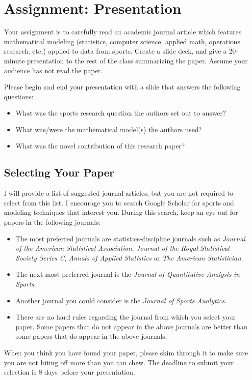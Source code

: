 \documentclass{article}
\begin{document}
  \section*{\sc Assignment: Presentation}

    Your assignment is to carefully read an academic journal article which features mathematical modeling (statistics, computer science, applied math, operations research, etc.) applied to data from sports. Create a slide deck, and give a 20-minute presentation to the rest of the class summarizing the paper. Assume your audience has not read the paper.
    
    Please begin and end your presentation with a slide that answers the following questions:
    \begin{itemize}
      \item What was the sports research question the authors set out to answer?
      \item What was/were the mathematical model(s) the authors used?
      \item What was the novel contribution of this research paper?
    \end{itemize}

    \subsection*{\sc Selecting Your Paper}
      
      I will provide a list of suggested journal articles, but you are not required to select from this list. I encourage you to search Google Scholar for sports and modeling techniques that interest you. During this search, keep an eye out for papers in the following journals:

      \begin{itemize}
        \item The most preferred journals are statistics-discipline journals such as {\it Journal of the American Statistical Association}, {\it Journal of the Royal Statistical Society Series C}, {\it Annals of Applied Statistics} or {\it The American Statistician}.
        \item The next-most preferred journal is the {\it Journal of Quantitative Analysis in Sports}.
        \item Another journal you could consider is the {\it Journal of Sports Analytics}.
        \item There are no hard rules regarding the journal from which you select your paper. Some papers that do not appear in the above journals are better than some papers that do appear in the above journals.
      \end{itemize}

      When you think you have found your paper, please skim through it to make sure you are not biting off more than you can chew. The deadline to submit your selection is 8 days before your presentation.
\end{document}
